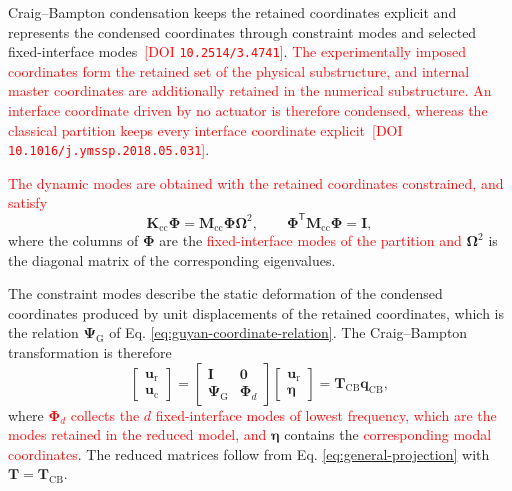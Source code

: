 \documentclass[11pt,a4paper]{article}
\numberwithin{equation}{section}
\newcommand{\rev}[1]{\textcolor{red}{#1}}
\begin{document}
Craig--Bampton condensation keeps the retained coordinates explicit and represents the condensed coordinates through constraint modes and selected fixed-interface modes \cite{CraigBampton1968}\,\rev{[DOI \nolinkurl{10.2514/3.4741}]}. \rev{The experimentally imposed coordinates form the retained set of the physical substructure, and internal master coordinates are additionally retained in the numerical substructure. An interface coordinate driven by no actuator is therefore condensed, whereas the classical partition keeps every interface coordinate explicit} \cite{Krattiger2019}\,\rev{[DOI \nolinkurl{10.1016/j.ymssp.2018.05.031}]}.

\rev{The dynamic modes are obtained with the retained coordinates constrained, and satisfy}
\begin{equation}
	\mathbf{K}_{\mathrm{cc}}\bm{\Phi}
	=\mathbf{M}_{\mathrm{cc}}\bm{\Phi}\bm{\Omega}^{2},
	\qquad
	\bm{\Phi}^{\mathsf{T}}\mathbf{M}_{\mathrm{cc}}\bm{\Phi}=\mathbf{I},
	\label{eq:fixed-interface-modes}
\end{equation}
where the columns of \(\bm{\Phi}\) are the \rev{fixed-interface modes of the partition and} \(\bm{\Omega}^{2}\) is the diagonal matrix of the corresponding eigenvalues.

The constraint modes describe the static deformation of the condensed coordinates produced by unit displacements of the retained coordinates, which is the relation \(\bm{\Psi}_{\mathrm{G}}\) of Eq. \eqref{eq:guyan-coordinate-relation}. The Craig--Bampton transformation is therefore
\begin{equation}
	\begin{bmatrix}
		\bm{u}_{\mathrm{r}}\\
		\bm{u}_{\mathrm{c}}
	\end{bmatrix}
	=
	\begin{bmatrix}
		\mathbf{I} & \mathbf{0}\\
		\bm{\Psi}_{\mathrm{G}} & \bm{\Phi}_{d}
	\end{bmatrix}
	\begin{bmatrix}
		\bm{u}_{\mathrm{r}}\\
		\bm{\eta}
	\end{bmatrix}
	=
	\mathbf{T}_{\mathrm{CB}}\bm{q}_{\mathrm{CB}},
	\label{eq:cb-transformation}
\end{equation}
where \rev{\(\bm{\Phi}_{d}\) collects the \(d\) fixed-interface modes of lowest frequency, which are the modes retained in the reduced model, and} \(\bm{\eta}\) contains the \rev{corresponding modal coordinates}. The reduced matrices follow from Eq. \eqref{eq:general-projection} with \(\mathbf{T}=\mathbf{T}_{\mathrm{CB}}\).
\end{document}
